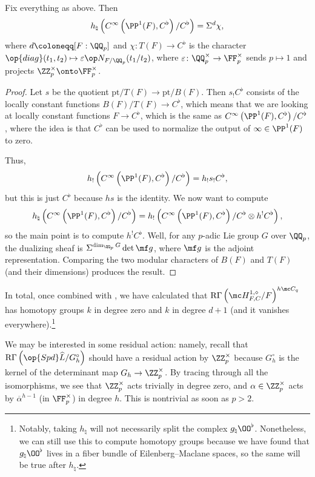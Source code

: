 \documentclass[../notes.tex]{subfiles}
\begin{document}
\begin{lemma}
	Fix everything as above. Then
	\[h_\natural\left(C^\infty\left(\PP^1(F),C^\flat\right)/C^\flat\right)=\Sigma^d\chi,\]
	where $d\coloneqq[F:\QQ_p]$ and $\chi\colon T(F)\to C^\flat$ is the character $\op{diag}(t_1,t_2)\mapsto\varepsilon\op N_{F/\QQ_p}(t_1/t_2)$, where $\varepsilon\colon\QQ_p^\times\to\FF_p^\times$ sends $p\mapsto1$ and projects $\ZZ_p^\times\onto\FF_p^\times$.
\end{lemma}
\begin{proof}
	Let $s$ be the quotient $\mathrm{pt}/T(F)\to\mathrm{pt}/B(F)$. Then $s_!C^\flat$ consists of the locally constant functions $B(F)/T(F)\to C^\flat$, which means that we are looking at locally constant functions $F\to C^\flat$, which is the same as $C^\infty\left(\PP^1(F),C^\flat\right)/C^\flat$, where the idea is that $C^\flat$ can be used to normalize the output of $\infty\in\PP^1(F)$ to zero.

	Thus,
	\[h_!\left(C^\infty\left(\PP^1(F),C^\flat\right)/C^\flat\right)=h_!s_!C^\flat,\]
	but this is just $C^\flat$ because $hs$ is the identity. We now want to compute
	\[h_\natural\left(C^\infty\left(\PP^1(F),C^\flat\right)/C^\flat\right)=h_!\left(C^\infty\left(\PP^1(F),C^\flat\right)/C^\flat\otimes h^!C^\flat\right),\]
	so the main point is to compute $h^!C^\flat$. Well, for any $p$-adic Lie group $G$ over $\QQ_p$, the dualizing sheaf is $\Sigma^{\dim_{\QQ_p}G}\det\mf g$, where $\mf g$ is the adjoint representation. Comparing the two modular characters of $B(F)$ and $T(F)$ (and their dimensions) produces the result.
\end{proof}
In total, once combined with , we have calculated that $\mathrm R\Gamma\left(\mc H^{1,\diamond}_{F,C}/F\right)^{h\mc C_q}$ has homotopy groups $k$ in degree zero and $k$ in degree $d+1$ (and it vanishes everywhere).\footnote{Notably, taking $h_\natural$ will not necessarily split the complex $g_\natural\OO^\flat$. Nonetheless, we can still use this to compute homotopy groups because we have found that $g_\natural\OO^\flat$ lives in a fiber bundle of Eilenberg--Maclane spaces, so the same will be true after $h_\natural$.}
\begin{remark}
	We may be interested in some residual action: namely, recall that $\mathrm R\Gamma\left(\op{Spd}\widehat L/G^\circ_h\right)$ should have a residual action by $\ZZ_p^\times$ because $G^\circ_h$ is the kernel of the determinant map $G_h\to\ZZ_p^\times$. By tracing through all the isomorphisms, we see that $\ZZ_p^\times$ acts trivially in degree zero, and $\alpha\in\ZZ_p^\times$ acts by $\overline\alpha^{h-1}$ (in $\FF_p^\times$) in degree $h$. This is nontrivial as soon as $p>2$.
\end{remark}
\end{document}
